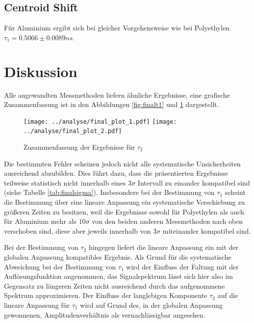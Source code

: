 \documentclass[a4paper,12pt]{article}
\begin{document}
\FloatBarrier
\subsection{Centroid Shift}
Für Aluminium ergibt sich bei gleicher Vorgehensweise wie bei Polyethylen $τ_1 = 0.5066 \pm 0.0089
\si{ns}$.

\section{Diskussion}
Alle angewandten Messmethoden liefern ähnliche Ergebnisse, eine grafische Zusammenfassung ist in den
Abbildungen \ref{fig:finalt1} und \ref{fig:finalt2} dargestellt.

\begin{figure}[h]
	\texttt{[image: ../analyse/final\_plot\_1.pdf]}
	\texttt{[image: ../analyse/final\_plot\_2.pdf]}
	\caption{Zusammenfassung der Ergebnisse für $\tau_{2}$ }
	\label{fig:finalt2}
\end{figure}

Die bestimmten Fehler scheinen jedoch nicht alle systematische Unsicherheiten ausreichend abzubilden.
Dies führt dazu, dass die präsentierten Ergebnisse teilweise statistisch nicht innerhalb eines $3\sigma$ Intervall
zu einander kompatibel sind (siehe Tabelle \ref{tab:finalsigma}). Insbesondere bei der Bestimmung von $\tau_{1}$ scheint die Bestimmung über eine
lineare Anpassung ein systematische Verschiebung zu größeren Zeiten zu besitzen, weil die Ergebnisse
sowohl für Polyethylen als auch für Aluminium mehr als
$10σ$ von den beiden anderen Messmethoden nach oben verschoben sind, diese aber jeweils innerhalb von
$3σ$ miteinander kompatibel sind.

Bei der Bestimmung von $\tau_{2}$
hingegen liefert die lineare Anpassung ein mit der globalen Anpassung kompatibles Ergebnis. Als Grund für die systematische Abweichung bei der
Bestimmung von $\tau_{1}$ wird der Einfluss der Faltung mit der Auflösungsfunktion angenommen, das Signalspektrum lässt sich hier also im Gegensatz zu längeren
Zeiten nicht ausreichend durch das aufgenommene Spektrum approximieren. Der Einfluss der langlebigen Komponente $\tau_{2}$ auf die lineare Anpassung für $\tau_{1}$
wird auf Grund des, in der globalen Anpassung gewonnenen, Amplitudenverhältnis als vernachlässigbar angesehen.
\end{document}
